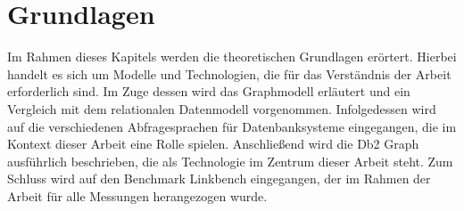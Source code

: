 \chapter{Grundlagen}
Im Rahmen dieses Kapitels werden die theoretischen Grundlagen erörtert. Hierbei handelt es sich um Modelle und Technologien, die für das Verständnis der Arbeit erforderlich sind. Im Zuge dessen wird das Graphmodell erläutert und ein Vergleich mit dem relationalen Datenmodell vorgenommen. Infolgedessen wird auf die verschiedenen Abfragesprachen für Datenbanksysteme eingegangen, die im Kontext dieser Arbeit eine Rolle spielen. Anschließend wird die Db2 Graph ausführlich beschrieben, die als Technologie im Zentrum dieser Arbeit steht. Zum Schluss wird auf den Benchmark Linkbench eingegangen, der im Rahmen der Arbeit für alle Messungen herangezogen wurde.





